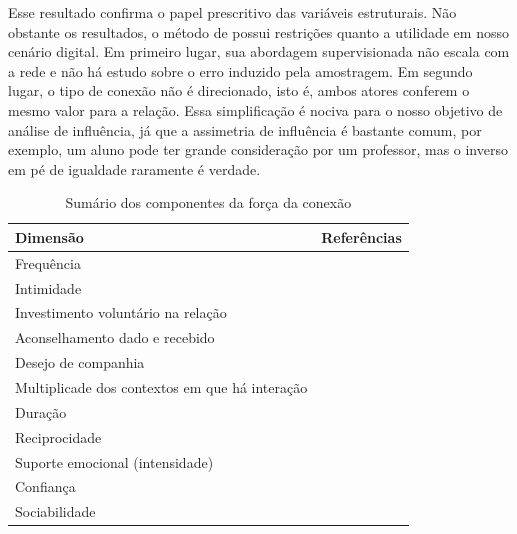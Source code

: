 Esse resultado confirma o papel prescritivo das variáveis estruturais. Não
obstante os resultados, o método de \citet{Gilbert2009} possui restrições quanto
a utilidade em nosso cenário digital. Em primeiro lugar, sua abordagem
supervisionada não escala com a rede e não há estudo sobre o erro induzido pela
amostragem. Em segundo lugar, o tipo de conexão não é direcionado, isto é, ambos
atores conferem o mesmo valor para a relação. Essa simplificação é nociva para o
nosso objetivo de análise de influência, já que a assimetria de influência é
bastante comum, por exemplo, um aluno pode ter grande consideração por um
professor, mas o inverso em pé de igualdade raramente é verdade.

\begin{table} [htbp]
	\setlength{\arrayrulewidth}{2\arrayrulewidth}  %
	\setlength{\belowcaptionskip}{10pt}  %
	\caption{Sumário dos componentes da força da conexão
	\citep{Petroczi2006}} \centering   %
	\begin{tabular}{| p{4cm} | p{8cm} |}
	\hline
	\textbf{Dimensão} & \textbf{Referências} \\ \hline\hline
	Frequência & \citet{Benassi1999, Blumstein1988, Granovetter1995,
	Marsden1984, MATHEWS1998, Mitchell1987, Perlman1987} \\\hline
	Intimidade & \citet{Blumstein1988, Marsden1984, MATHEWS1998, Mitchell1987,
	Perlman1987}\\\hline 
	Investimento voluntário na relação & \citet{Blumstein1988, Perlman1987}\\\hline
	Aconselhamento dado e recebido & \citet{MATHEWS1998}\\\hline 
	Desejo de companhia & \citet{Blumstein1988, Perlman1987}\\\hline 
	Multiplicade dos contextos em que há interação & \citet{Blumstein1988,
	Granovetter1973, Marsden1984, Perlman1987}\\\hline 
	Duração & \citet{Blumstein1988, Granovetter1973, Marsden1984,
	Perlman1987}\\\hline 
	Reciprocidade & \citet{Blumstein1988, Friedkin1980, Granovetter1973,
	MATHEWS1998, Perlman1987}\\\hline 
	Suporte	emocional (intensidade) & \citet{Blumstein1988, Granovetter1973,
	Mitchell1987, Perlman1987, Wellman1982, Wellman1990}\\\hline
	Confiança & \citet{Granovetter1973, Marsden1984, MATHEWS1998}\\\hline
	Sociabilidade & \citet{Mitchell1987}\\
	\hline
	\end{tabular}
	\label{tab:resumao}
\end{table}


